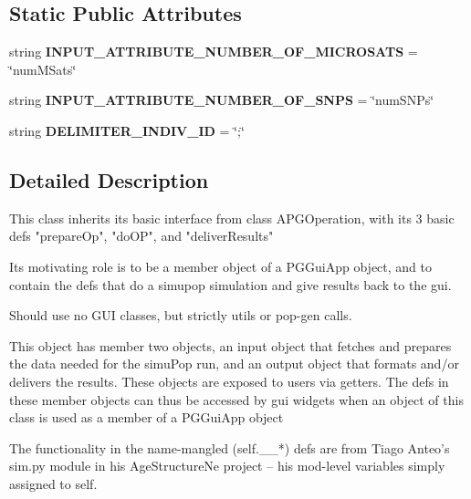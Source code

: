 \subsection*{Static Public Attributes}
\begin{DoxyCompactItemize}
\item 
string {\bfseries I\+N\+P\+U\+T\+\_\+\+A\+T\+T\+R\+I\+B\+U\+T\+E\+\_\+\+N\+U\+M\+B\+E\+R\+\_\+\+O\+F\+\_\+\+M\+I\+C\+R\+O\+S\+A\+TS} = \char`\"{}num\+M\+Sats\char`\"{}\hypertarget{classnegui_1_1pgopsimupop_1_1PGOpSimuPop_afad9fd5e836335f749ae96a958d3786e}{}\label{classnegui_1_1pgopsimupop_1_1PGOpSimuPop_afad9fd5e836335f749ae96a958d3786e}

\item 
string {\bfseries I\+N\+P\+U\+T\+\_\+\+A\+T\+T\+R\+I\+B\+U\+T\+E\+\_\+\+N\+U\+M\+B\+E\+R\+\_\+\+O\+F\+\_\+\+S\+N\+PS} = \char`\"{}num\+S\+N\+Ps\char`\"{}\hypertarget{classnegui_1_1pgopsimupop_1_1PGOpSimuPop_ac0c65641439fe744a0b62bd037145b3b}{}\label{classnegui_1_1pgopsimupop_1_1PGOpSimuPop_ac0c65641439fe744a0b62bd037145b3b}

\item 
string {\bfseries D\+E\+L\+I\+M\+I\+T\+E\+R\+\_\+\+I\+N\+D\+I\+V\+\_\+\+ID} = \char`\"{};\char`\"{}\hypertarget{classnegui_1_1pgopsimupop_1_1PGOpSimuPop_a23ef02f2da1b42907e37ba9d493a835a}{}\label{classnegui_1_1pgopsimupop_1_1PGOpSimuPop_a23ef02f2da1b42907e37ba9d493a835a}

\end{DoxyCompactItemize}


\subsection{Detailed Description}
\begin{DoxyVerb}This class inherits its basic interface from class APGOperation, with its 3
basic defs "prepareOp", "doOP", and "deliverResults"

Its motivating role is to be a member object of a PGGuiApp object, and to contain the
defs that do a simupop simulation and give results back to the gui.

Should use no GUI classes, but strictly utils or pop-gen calls.

This object has member two objects, an input object that fetches and prepares the
data needed for the simuPop run, and an output object that formats and/or delivers
the results.   These objects are exposed to users via getters.  The defs in these 
member objects can thus be accessed by gui widgets when an object of this class  
is used as a member of a PGGuiApp object

The functionality in the name-mangled (self.__*) defs are from Tiago Anteo's sim.py module in 
his AgeStructureNe project -- his mod-level variables simply assigned to self.
\end{DoxyVerb}
 

